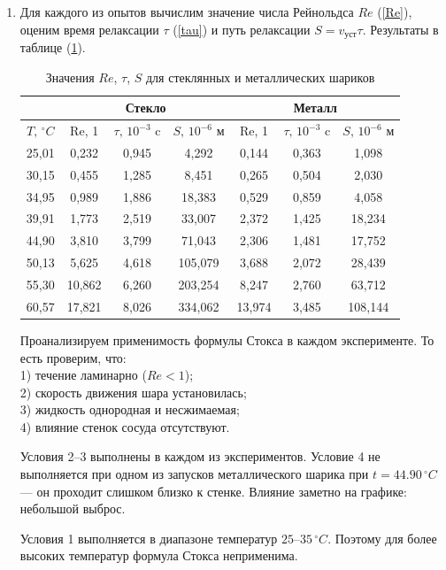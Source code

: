 \documentclass[a4paper,12pt]{article} %
\begin{document}
\begin{enumerate}
  \item Для каждого из опытов вычислим значение числа Рейнольдса $Re$ (\ref{Re}), оценим время релаксации $\tau$ (\ref{tau}) и путь релаксации $S = v_\text{уст} \tau$. Результаты в таблице (\ref{tab:ReTauS}). 
  
	\begin{table}[h!]
    \centering
    \begin{tabular}{|c|c|c|c||c|c|c|}
			\hline
			& \multicolumn{3}{c||}{Стекло} & \multicolumn{3}{c|}{Металл} \\
			\hline
			$T, \, ^\circ C$ & Re, 1 & $\tau, \, 10^{-3}$ c & $S, \, 10^{-6}$ м & Re, 1 & $\tau, \, 10^{-3}$ c & $S, \, 10^{-6}$ м \\
			\hline
			25,01 & 0,232 & 0,945 & 4,292 & 0,144 & 0,363 & 1,098 \\
			30,15 & 0,455 & 1,285 & 8,451 & 0,265 & 0,504 & 2,030 \\
			34,95 & 0,989 & 1,886 & 18,383 & 0,529 & 0,859 & 4,058 \\
			39,91 & 1,773 & 2,519 & 33,007 & 2,372 & 1,425 & 18,234 \\
			44,90 & 3,810 & 3,799 & 71,043 & 2,306 & 1,481 & 17,752 \\
			50,13 & 5,625 & 4,618 & 105,079 & 3,688 & 2,072 & 28,439 \\
			55,30 & 10,862 & 6,260 & 203,254 & 8,247 & 2,760 & 63,712 \\
			60,57 & 17,821 & 8,026 & 334,062 & 13,974 & 3,485 & 108,144 \\
			\hline
    \end{tabular}
    \caption{Значения $Re$, $\tau$, $S$ для стеклянных и металлических шариков}
    \label{tab:ReTauS}
	\end{table}	

	Проанализируем применимость формулы Стокса в каждом эксперименте. То есть проверим, что: \\
	1) течение ламинарно ($Re < 1$); \\
	2) скорость движения шара установилась; \\
	3) жидкость однородная и несжимаемая; \\
	4) влияние стенок сосуда отсутствуют. 

	Условия 2–3 выполнены в каждом из экспериментов. Условие 4 не выполняется при одном из запусков металлического шарика при $t = 44.90 \, ^\circ C$ — он проходит слишком близко к стенке. Влияние заметно на графике: небольшой выброс.

	Условия 1 выполняется в диапазоне температур $25 – 35 \, ^\circ C$. Поэтому для более высоких температур формула Стокса неприменима.
  

\end{enumerate}
\end{document}
